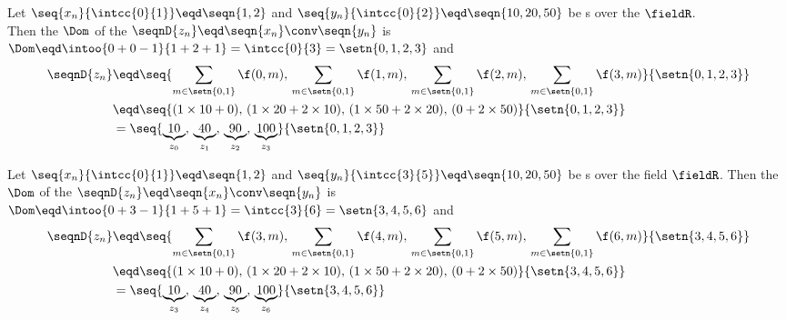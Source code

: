 \begin{example}
Let $\seq{x_n}{\intcc{0}{1}}\eqd\seqn{1,2}$ 
and $\seq{y_n}{\intcc{0}{2}}\eqd\seqn{10,20,50}$ be s over the  $\fieldR$.\\
Then the  $\Dom$ of the  $\seqnD{z_n}\eqd\seqn{x_n}\conv\seqn{y_n}$ is
\\\indentx$\Dom\eqd\intoo{0+0-1}{1+2+1}=\intcc{0}{3}=\setn{0,1,2,3}$ and 
\begin{align*}
  \seqnD{z_n} 
    &\eqd \seq{\sum_{m\in\setn{0,1}}\f(0,m),\, \sum_{m\in\setn{0,1}}\f(1,m),\, \sum_{m\in\setn{0,1}}\f(2,m),\, \sum_{m\in\setn{0,1}}\f(3,m)}{\setn{0,1,2,3}}
  \\&\eqd \seq{(1\times10+0),\, (1\times20+2\times10),\, (1\times50+2\times20),\, (0+2\times50)}{\setn{0,1,2,3}}
  \\&=    \seq{\underbrace{ 10}_{z_0},\,
               \underbrace{ 40}_{z_1},\,
               \underbrace{ 90}_{z_2},\,
               \underbrace{100}_{z_3}
              }{\setn{0,1,2,3}}
\end{align*}
\end{example}

\begin{example}
Let $\seq{x_n}{\intcc{0}{1}}\eqd\seqn{1,2}$ 
and $\seq{y_n}{\intcc{3}{5}}\eqd\seqn{10,20,50}$ be s over the field $\fieldR$.
Then the  $\Dom$ of the  $\seqnD{z_n}\eqd\seqn{x_n}\conv\seqn{y_n}$ is
\\\indentx$\Dom\eqd\intoo{0+3-1}{1+5+1}=\intcc{3}{6}=\setn{3,4,5,6}$ and
\begin{align*}
  \seqnD{z_n} 
    &\eqd \seq{\sum_{m\in\setn{0,1}}\f(3,m),\, \sum_{m\in\setn{0,1}}\f(4,m),\, \sum_{m\in\setn{0,1}}\f(5,m),\, \sum_{m\in\setn{0,1}}\f(6,m)}{\setn{3,4,5,6}}
  \\&\eqd \seq{(1\times10+0),\, (1\times20+2\times10),\, (1\times50+2\times20),\, (0+2\times50)}{\setn{3,4,5,6}}
  \\&=    \seq{\underbrace{ 10}_{z_3},\,
               \underbrace{ 40}_{z_4},\,
               \underbrace{ 90}_{z_5},\,
               \underbrace{100}_{z_6}
              }{\setn{3,4,5,6}}
\end{align*}
\end{example}

